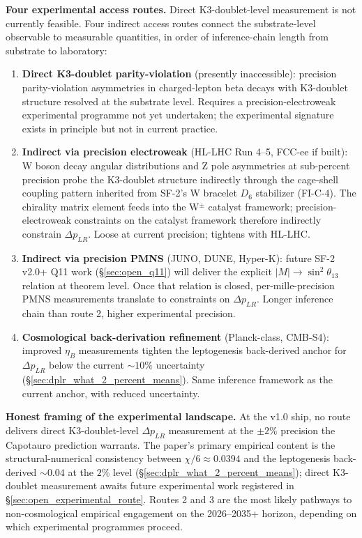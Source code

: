 \documentclass[11pt,letterpaper]{article}
\newcommand{\DeltapLR}{\Delta p_{LR}}
\newcommand{\Dsix}{D_6}
\begin{document}
\textbf{Four experimental access routes.} Direct K3-doublet-level measurement is not currently feasible. Four indirect access routes connect the substrate-level observable to measurable quantities, in order of inference-chain length from substrate to laboratory:

\begin{enumerate}\setlength\itemsep{0.3em}
    \item \textbf{Direct K3-doublet parity-violation} (presently inaccessible): precision parity-violation asymmetries in charged-lepton beta decays with K3-doublet structure resolved at the substrate level. Requires a precision-electroweak experimental programme not yet undertaken; the experimental signature exists in principle but not in current practice.
    \item \textbf{Indirect via precision electroweak} (HL-LHC Run 4--5, FCC-ee if built): W boson decay angular distributions and Z pole asymmetries at sub-percent precision probe the K3-doublet structure indirectly through the cage-shell coupling pattern inherited from SF-2's W bracelet $\Dsix$ stabilizer (FI-C-4). The chirality matrix element feeds into the W$^\pm$ catalyst framework; precision-electroweak constraints on the catalyst framework therefore indirectly constrain $\DeltapLR$. Loose at current precision; tightens with HL-LHC.
    \item \textbf{Indirect via precision PMNS} (JUNO, DUNE, Hyper-K): future SF-2 v2.0+ Q11 work (\S\ref{sec:open_q11}) will deliver the explicit $|M| \to \sin^2\theta_{13}$ relation at theorem level. Once that relation is closed, per-mille-precision PMNS measurements translate to constraints on $\DeltapLR$. Longer inference chain than route 2, higher experimental precision.
    \item \textbf{Cosmological back-derivation refinement} (Planck-class, CMB-S4): improved $\eta_B$ measurements tighten the leptogenesis back-derived anchor for $\DeltapLR$ below the current $\sim 10\%$ uncertainty (\S\ref{sec:dplr_what_2_percent_means}). Same inference framework as the current anchor, with reduced uncertainty.
\end{enumerate}

\textbf{Honest framing of the experimental landscape.} At the v1.0 ship, no route delivers direct K3-doublet-level $\DeltapLR$ measurement at the $\pm 2\%$ precision the Capotauro prediction warrants. The paper's primary empirical content is the structural-numerical consistency between $\chi/6 \approx 0.0394$ and the leptogenesis back-derived $\sim 0.04$ at the $2\%$ level (\S\ref{sec:dplr_what_2_percent_means}); direct K3-doublet measurement awaits future experimental work registered in \S\ref{sec:open_experimental_route}. Routes 2 and 3 are the most likely pathways to non-cosmological empirical engagement on the 2026--2035+ horizon, depending on which experimental programmes proceed.
\end{document}
